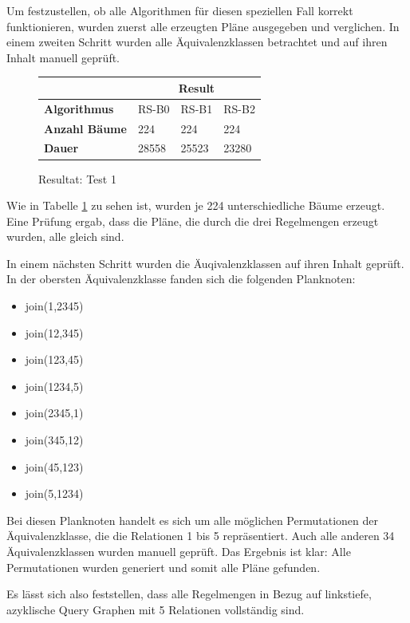Um festzustellen, ob alle Algorithmen für diesen speziellen Fall korrekt funktionieren, wurden zuerst alle erzeugten Pläne ausgegeben und verglichen. In einem zweiten Schritt wurden alle Äquivalenzklassen betrachtet und auf ihren Inhalt manuell geprüft.



\begin{figure}[ht]
\centering

\begin{tabular}{|l|l|l|l|}
\hline
                         & \multicolumn{3}{c|}{{\bf Result}} \\ \hline
{\bf Algorithmus}        & RS-B0     & RS-B1     & RS-B2     \\ \hline
{\bf Anzahl Bäume}       & 224       & 224       & 224       \\ \hline
{\bf Dauer}              & 28558  & 25523  & 23280  \\ \hline
\end{tabular}

\caption{Resultat: Test 1}
\label{Resultat:Test1}
\end{figure}

Wie in Tabelle \ref{Resultat:Test1} zu sehen ist, wurden je 224 unterschiedliche Bäume erzeugt. Eine Prüfung ergab, dass die Pläne, die durch die drei Regelmengen erzeugt wurden, alle gleich sind.

In einem nächsten Schritt wurden die Äuqivalenzklassen auf ihren Inhalt geprüft. In der obersten Äquivalenzklasse fanden sich die folgenden Planknoten:

\begin{itemize}
\item join(1,2345)
\item join(12,345)
\item join(123,45)
\item join(1234,5)
\item join(2345,1)
\item join(345,12)
\item join(45,123)
\item join(5,1234)
\end{itemize}

Bei diesen Planknoten handelt es sich um alle möglichen Permutationen der Äquivalenzklasse, die die Relationen 1 bis 5 repräsentiert. Auch alle anderen 34 Äquivalenzklassen wurden manuell geprüft. Das Ergebnis ist klar: Alle Permutationen wurden generiert und somit alle Pläne gefunden.

Es lässt sich also feststellen, dass alle Regelmengen in Bezug auf linkstiefe, azyklische Query Graphen mit 5 Relationen vollständig sind.

